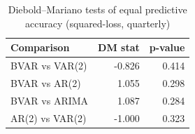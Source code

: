 \begin{table}

\caption{\label{tab:dm-tests}Diebold--Mariano tests of equal predictive accuracy (squared-loss, quarterly)}
\centering
\begin{tabular}[t]{lrr}
\toprule
Comparison & DM stat & p-value\\
\midrule
BVAR vs VAR(2) & -0.826 & 0.414\\
BVAR vs AR(2) & 1.055 & 0.298\\
BVAR vs ARIMA & 1.087 & 0.284\\
AR(2) vs VAR(2) & -1.000 & 0.323\\
\bottomrule
\end{tabular}
\end{table}
